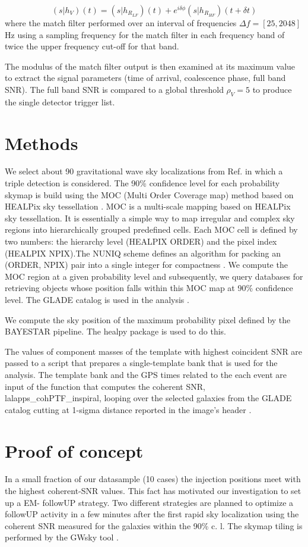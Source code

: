\documentclass[aps, prd, twocolumn, superscriptaddress, nofootinbib]{revtex4-1}
\begin{document}
\begin{equation}
    (s|h_V)(t)= (s|h_{R_{LF}})(t)+e^{i\delta\phi}(s|h_{R_{HF}})(t+\delta t)
\end{equation}
where the match filter performed over an interval of frequencies $\Delta f=[25,2048]$ Hz using a sampling frequency for the match filter in each frequency band of twice the
upper frequency cut-off for that band.

The modulus of the match filter output is then examined at its maximum value to
extract the signal parameters (time of arrival, coalescence phase, full band SNR). The full band SNR is compared to a global threshold $\rho_V=5$ to produce the single detector trigger list.

\section{Methods}
We select about 90 gravitational wave sky localizations from Ref.\cite{GoingTheDist} in which a triple detection is considered. The 90\% confidence level for each probability skymap is build using the MOC (Multi Order Coverage map) method based on HEALPix sky tessellation \cite{codiceGiuseppe}.
MOC is a multi-scale mapping based on HEALPix sky tessellation. It is essentially a simple way to map irregular and complex sky regions into hierarchically grouped predefined cells. Each MOC cell is defined by two numbers: the hierarchy level (HEALPIX ORDER) and the pixel index (HEALPIX NPIX).The NUNIQ scheme defines an algorithm for packing an (ORDER, NPIX) pair into a single integer for compactness \cite{MOC}.
We compute the MOC region at a given probability level and subsequently, we query databases for retrieving objects whose position falls within this MOC map at 90\% confidence level. The GLADE catalog is used in the analysis \cite{GLADE}.

We compute the sky position of the maximum probability pixel defined by the BAYESTAR pipeline. The healpy package \cite{Healpy} is used to do this.

The values of component masses of the template with highest coincident SNR are passed to a script that prepares a single-template bank that is used for the analysis.
The template bank and the GPS times related to the each event are input of the function that computes the coherent SNR, lalapps\_cohPTF\_inspiral, looping over the selected galaxies from the GLADE catalog cutting at 1-sigma distance reported in the image's header \cite{cohPTF}.


\section{Proof of concept}
In a small fraction of our datasample (10 cases) the injection positions meet with the highest coherent-SNR values. This fact has motivated our investigation to set up a EM- followUP strategy.
Two different strategies are planned to optimize a followUP activity in a few minutes after the first rapid sky localization using the coherent SNR measured for the galaxies within the 90\% c. l. The skymap tiling is performed by the GWsky tool \cite{GWSky}.
\end{document}
